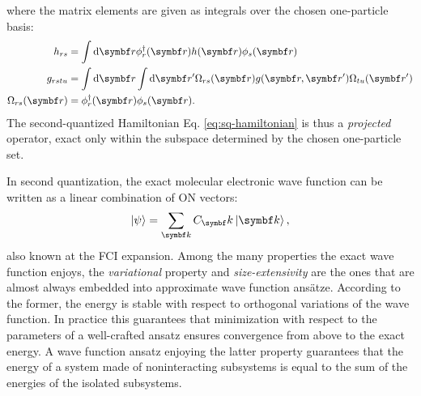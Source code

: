 where the matrix elements are given as integrals over the chosen
one-particle basis:
\begin{subequations}
 \begin{align}
   h_{rs} &= \int \diff\vect{r} \phi_r^\dagger(\vect{r}) h(\vect{r})\phi_s(\vect{r}) \label{eq:one-el}\\
   g_{rstu} &=
   \int\diff\vect{r}\int\diff\vect{r}^\prime
   \Omega_{rs}(\vect{r}) g(\vect{r},\vect{r}^\prime) \Omega_{tu}(\vect{r}^\prime) \label{eq:two-el} \\
  \Omega_{rs}(\vect{r}) &= \phi_r^\dagger(\vect{r})\phi_s(\vect{r}). \label{eq:overlap}
 \end{align}
\end{subequations}
The second-quantized Hamiltonian Eq. \eqref{eq:sq-hamiltonian} is thus a
\emph{projected} operator, exact only within the subspace determined by
the chosen one-particle set.\autocite{Gross1991-hi, Helgaker2000-tz}

In second quantization, the exact molecular electronic wave function can
be written as a linear combination of \acrshort{ON} vectors:
\begin{equation}\label{eq:fci}
  \ket{\psi} = \sum_{\vect{k}}C_\vect{k}\ket{\vect{k}},
\end{equation}
also known at the \gls{FCI} expansion.
Among the many properties the exact wave function enjoys, the
\emph{variational} property and \emph{size-extensivity} are the ones
that are almost always embedded into approximate wave function ans\"{a}tze.\autocite{Helgaker2000-tz}
According to the former, the energy is stable with respect to orthogonal
variations of the wave function. In practice this guarantees that
minimization with respect to the parameters of a well-crafted ansatz
ensures convergence from above to the exact energy.\autocite{Szabo1989-vl, McWeeny1992-oj, Helgaker2000-tz}
A wave function ansatz enjoying the latter property guarantees that the
energy of a system made of noninteracting subsystems is equal to the sum of
the energies of the isolated subsystems.\autocite{Helgaker2000-tz, Nooijen2005-ux}

